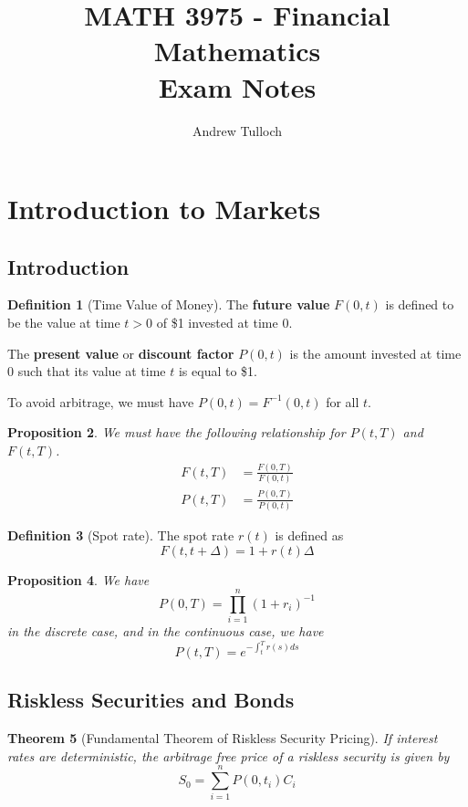 \documentclass[10pt, oneside, reqno]{amsart}
\title{MATH 3975 - Financial Mathematics \\ Exam Notes}								%
\author{Andrew Tulloch}
\theoremstyle{plain}%
\newtheorem{thm}{Theorem}[subsection]
\newtheorem{prop}[thm]{Proposition}
\theoremstyle{definition}
\newtheorem{defn}[thm]{Definition}
\theoremstyle{remark}
\begin{document}
\maketitle




\section{Introduction to Markets} %
\label{sec:introduction_to_markets}
\subsection{Introduction} %
\label{sub:introduction}

\begin{defn}[Time Value of Money]
	The \textbf{future value} $F(0,t)$ is defined to be the value at time $t > 0$ of \$1 invested at time $0$.  
	
	The \textbf{present value} or \textbf{discount factor} $P(0,t)$ is the amount invested at time $0$ such that its value at time $t$ is equal to \$1.  
\end{defn}

To avoid arbitrage, we must have $P(0,t) = F^{-1}(0,t)$ for all $t$.

\begin{prop}
	We must have the following relationship for $P(t,T)$ and $F(t,T)$.
	\begin{align*}
		F(t,T) &= \frac{F(0,T)}{F(0,t)} \\
		P(t,T) &= \frac{P(0,T)}{P(0,t)}
	\end{align*}
\end{prop}

\begin{defn}[Spot rate]
	The spot rate $r(t)$ is defined as \[
		F(t,t + \Delta) = 1 + r(t) \Delta
	\]
\end{defn}

\begin{prop}
	We have \[
		P(0,T) = \prod_{i=1}^n (1 + r_i)^{-1}
	\] in the discrete case, and in the continuous case, we have \[
		P(t,T) = e^{- \int_t^T r(s) ds}
	\]

\end{prop}



\subsection{Riskless Securities and Bonds} %
\label{sub:riskless_securities_and_bonds}
\begin{thm}[Fundamental Theorem of Riskless Security Pricing]
	If interest rates are deterministic, the arbitrage free price of a riskless security is given by
	\[
		S_0 = \sum_{i=1}^n P(0,t_i) C_i
	\]
\end{thm}
\end{document}
